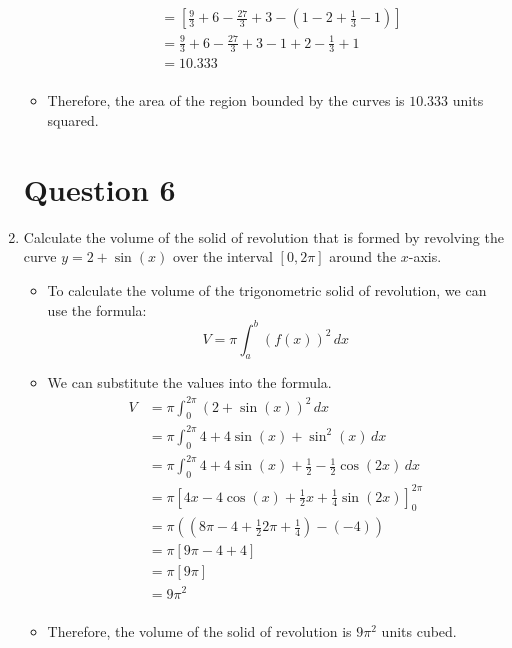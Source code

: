 \documentclass[12pt]{article}
\begin{document}
\begin{enumerate}[leftmargin=\labelsep]
\begin{itemize}[label={}]
\begin{equation*}
\begin{split}
                &= \left[ \frac{9}{3} + 6 - \frac{27}{3} + 3 - \left( 1 - 2 + \frac{1}{3} - 1 \right) \right] \\
                &= \frac{9}{3} + 6 - \frac{27}{3} + 3 - 1 + 2 - \frac{1}{3} + 1 \\
                &= 10.333 \\
            \end{split}
        \end{equation*}
        \item Therefore, the area of the region bounded by the curves is $10.333$ units squared.
    \end{itemize}

    \newpage

    \section*{Question 6}

    \item Calculate the volume of the solid of revolution that is formed by revolving the curve $y=2+\sin (x)$ over the interval $[0, 2\pi]$ around the $x$-axis.
    \begin{itemize}[label={}]
        \item To calculate the volume of the trigonometric solid of revolution, we can use the formula:
        \begin{equation*}
            \displaystyle{V = \pi \int_{a}^{b} (f(x))^2 \, dx}
        \end{equation*}
        \item We can substitute the values into the formula.
        \begin{equation*}
            \begin{split}
                V &= \pi \int_{0}^{2\pi} (2+\sin (x))^2 \, dx \\
                &= \pi \int_{0}^{2\pi} 4 + 4\sin (x) + \sin^2 (x) \, dx \\
                &= \pi \int_{0}^{2\pi} 4 + 4\sin (x) + \frac{1}{2} - \frac{1}{2} \cos (2x) \, dx \\
                &= \pi \left[ 4x - 4\cos (x) + \frac{1}{2} x + \frac{1}{4} \sin (2x) \right]_{0}^{2\pi} \\
                &= \pi \left( \left( 8\pi - 4 + \frac{1}{2} 2\pi + \frac{1}{4}\right) - \left( -4 \right)   \right) \\
                &= \pi \left[ 9\pi -4 +4 \right] \\
                &= \pi \left[ 9\pi \right] \\
                &= 9\pi^2 \\
            \end{split}
        \end{equation*}
        \item Therefore, the volume of the solid of revolution is $9\pi^2$ units cubed.
    \end{itemize}


\end{enumerate}
\end{document}
